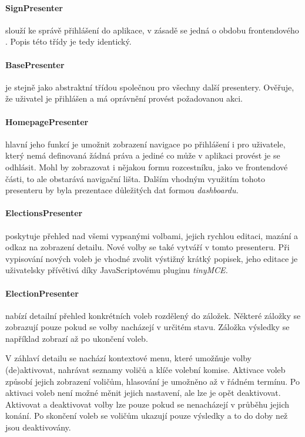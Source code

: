 \clearpage

\paragraph{SignPresenter} slouží ke správě přihlášení do aplikace, v zásadě se jedná o obdobu frontendového . Popis této třídy je tedy identický.


\paragraph{BasePresenter} je stejně jako  abstraktní třídou společnou pro všechny další presentery. Ověřuje, že uživatel je přihlášen a má oprávnění provést požadovanou akci.


\paragraph{HomepagePresenter} hlavní jeho funkcí je umožnit zobrazení navigace po přihlášení i pro uživatele, který nemá definovaná žádná práva a jediné co může v aplikaci provést je se odhlásit. Mohl by zobrazovat i nějakou formu rozcestníku, jako ve frontendové části, to ale obstarává navigační lišta. Dalším vhodným využitím tohoto presenteru by byla prezentace důležitých dat formou \it{dashboardu}.


\paragraph{ElectionsPresenter} poskytuje přehled nad všemi vypsanými volbami, jejich rychlou editaci, mazání a odkaz na zobrazení detailu. Nové volby se také vytváří v tomto presenteru. Při vypisování nových voleb je vhodné zvolit výstižný krátký popisek, jeho editace je uživatelsky přívětivá díky JavaScriptovému pluginu \it{tinyMCE}.


\paragraph{ElectionPresenter} nabízí detailní přehled konkrétních voleb rozdělený do záložek. Některé záložky se zobrazují pouze pokud se volby nacházejí v určitém stavu. Záložka výsledky se například zobrazí až po ukončení voleb. 

V záhlaví detailu se nachází kontextové menu, které umožňuje volby (de)aktivovat, nahrávat seznamy voličů a klíče volební komise. Aktivace voleb způsobí jejich zobrazení voličům, hlasování je umožněno až v řádném termínu. Po aktivaci voleb není možné měnit jejich nastavení, ale lze je opět deaktivovat. Aktivovat a deaktivovat volby lze pouze pokud se nenacházejí v průběhu jejich konání. Po skončení voleb se voličům ukazují pouze výsledky a to do doby než jsou deaktivovány.

